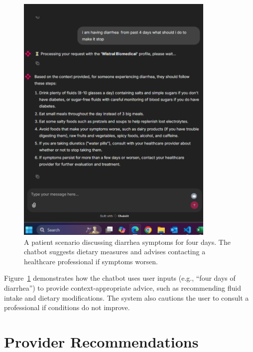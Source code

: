 \begin{figure}[htbp]
    \centering
    \includegraphics[width=0.85\textwidth]{Images/patientsymptoms.png}
    \caption{A patient scenario discussing diarrhea symptoms for four days. The chatbot suggests dietary measures and advises contacting a healthcare professional if symptoms worsen.}
    \label{fig:diarrhea-question}
\end{figure}

Figure~\ref{fig:diarrhea-question} demonstrates how the chatbot uses user inputs (e.g., “four days of diarrhea”) to provide context-appropriate advice, such as recommending fluid intake and dietary modifications. The system also cautions the user to consult a professional if conditions do not improve.

\section{Provider Recommendations}
\label{sec:doctor-recommendations}

